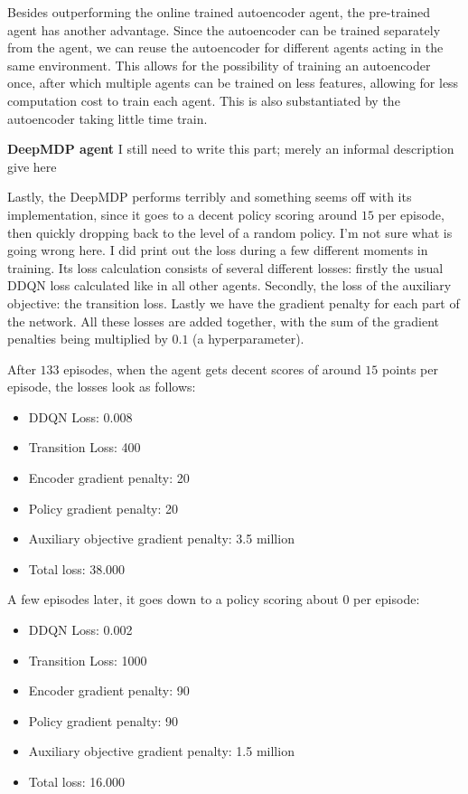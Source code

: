 Besides outperforming the online trained autoencoder agent, the pre-trained agent has another advantage. Since the autoencoder can be trained separately from the agent, we can reuse the autoencoder for different agents acting in the same environment. This allows for the possibility of training an autoencoder once, after which multiple agents can be trained on less features, allowing for less computation cost to train each agent. This is also substantiated by the autoencoder taking little time train. \newline

\noindent \textbf{DeepMDP agent}\newline
\noindent
I still need to write this part; merely an informal description give here

Lastly, the DeepMDP performs terribly and something seems off with its implementation, since it goes to a decent policy scoring around $15$ per episode, then quickly dropping back to the level of a random policy. I'm not sure what is going wrong here. I did print out the loss during a few different moments in training. Its loss calculation consists of several different losses: firstly the usual DDQN loss calculated like in all other agents. Secondly, the loss of the auxiliary objective: the transition loss. Lastly we have the gradient penalty for each part of the network. All these losses are added together, with the sum of the gradient penalties being multiplied by $0.1$ (a hyperparameter).

After $133$ episodes, when the agent gets decent scores of around $15$ points per episode, the losses look as follows:
\begin{itemize}
\item DDQN Loss: 0.008
\item Transition Loss: 400
\item Encoder gradient penalty: 20
\item Policy gradient penalty: 20
\item Auxiliary objective gradient penalty: 3.5 million
\item Total loss: 38.000
\end{itemize}

A few episodes later, it goes down to a policy scoring about $0$ per episode:
\begin{itemize}
\item DDQN Loss: 0.002
\item Transition Loss: 1000
\item Encoder gradient penalty: 90
\item Policy gradient penalty: 90
\item Auxiliary objective gradient penalty: 1.5 million
\item Total loss: 16.000
\end{itemize}

